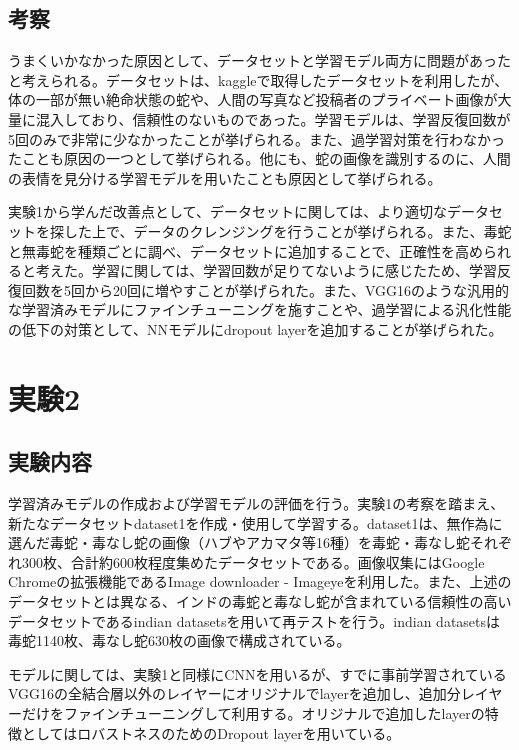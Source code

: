 \documentclass[a4paper, 11pt, titlepage]{jsarticle}
\begin{document}
\subsection{考察}
うまくいかなかった原因として、データセットと学習モデル両方に問題があったと考えられる。データセットは、kaggleで取得したデータセットを利用したが、体の一部が無い絶命状態の蛇や、人間の写真など投稿者のプライベート画像が大量に混入しており、信頼性のないものであった。学習モデルは、学習反復回数が5回のみで非常に少なかったことが挙げられる。また、過学習対策を行わなかったことも原因の一つとして挙げられる。他にも、蛇の画像を識別するのに、人間の表情を見分ける学習モデルを用いたことも原因として挙げられる。\par
実験1から学んだ改善点として、データセットに関しては、より適切なデータセットを探した上で、データのクレンジングを行うことが挙げられる。また、毒蛇と無毒蛇を種類ごとに調べ、データセットに追加することで、正確性を高められると考えた。学習に関しては、学習回数が足りてないように感じたため、学習反復回数を5回から20回に増やすことが挙げられた。また、VGG16のような汎用的な学習済みモデルにファインチューニングを施すことや、過学習による汎化性能の低下の対策として、NNモデルにdropout layerを追加することが挙げられた。\par

\section{実験2}
\subsection{実験内容}
学習済みモデルの作成および学習モデルの評価を行う。実験1の考察を踏まえ、新たなデータセットdataset1を作成・使用して学習する。dataset1は、無作為に選んだ毒蛇・毒なし蛇の画像（ハブやアカマタ等16種）を毒蛇・毒なし蛇それぞれ300枚、合計約600枚程度集めたデータセットである。画像収集にはGoogle Chromeの拡張機能であるImage downloader - Imageye\cite{theme6}を利用した。また、上述のデータセットとは異なる、インドの毒蛇と毒なし蛇が含まれている信頼性の高いデータセットであるindian datasetsを用いて再テストを行う。indian datasetsは毒蛇1140枚、毒なし蛇630枚の画像で構成されている。\par
モデルに関しては、実験1と同様にCNNを用いるが、すでに事前学習されているVGG16の全結合層以外のレイヤーにオリジナルでlayerを追加し、追加分レイヤーだけをファインチューニングして利用する。オリジナルで追加したlayerの特徴としてはロバストネスのためのDropout layerを用いている。\par
\end{document}

